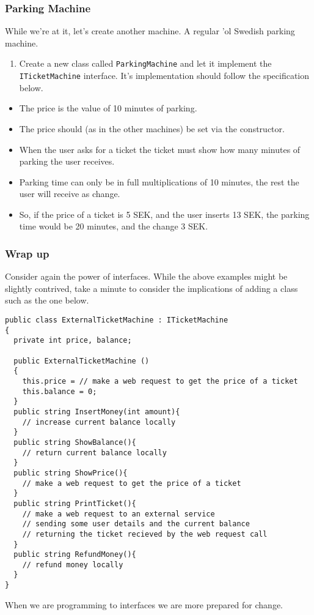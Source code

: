 \documentclass{article}
\newcounter{stepcounter}
\newenvironment{steps}{ 
  \begin{enumerate}[label=\color{red}Step \theenumi)]
    \setcounter{enumi}{\value{stepcounter}}
}{
  \setcounter{stepcounter}{\value{enumi}}
  \end{enumerate}
}
\begin{document}
\subsubsection{Parking Machine}
While we're at it, let's create another machine. A regular 'ol Swedish parking machine.

\begin{steps}
\item Create a new class called \texttt{ParkingMachine} and let it implement the \texttt{ITicketMachine} interface. It's implementation should follow the specification below.
\end{steps}
\begin{itemize}
  \item The price is the value of 10 minutes of parking.
  \item The price should (as in the other machines) be set via the constructor.
  \item When the user asks for a ticket the ticket must show how many minutes of parking the user receives.
  \item Parking time can only be in full multiplications of 10 minutes, the rest the user will receive as change.
  \item So, if the price of a ticket is 5 SEK, and the user inserts 13 SEK, the parking time would be 20 minutes, and the change 3 SEK.
\end{itemize}



\subsubsection{Wrap up}
Consider again the power of interfaces. While the above examples might be slightly contrived, take a minute to consider the implications of adding a class such as the one below.
\begin{lstlisting}
public class ExternalTicketMachine : ITicketMachine
{ 
  private int price, balance;

  public ExternalTicketMachine ()
  {
    this.price = // make a web request to get the price of a ticket
    this.balance = 0;
  }
  public string InsertMoney(int amount){
    // increase current balance locally
  }
  public string ShowBalance(){
    // return current balance locally
  }
  public string ShowPrice(){
    // make a web request to get the price of a ticket
  }
  public string PrintTicket(){
    // make a web request to an external service
    // sending some user details and the current balance
    // returning the ticket recieved by the web request call
  }
  public string RefundMoney(){
    // refund money locally
  }
}
\end{lstlisting}
When we are programming to interfaces we are more prepared for change.
\end{document}
